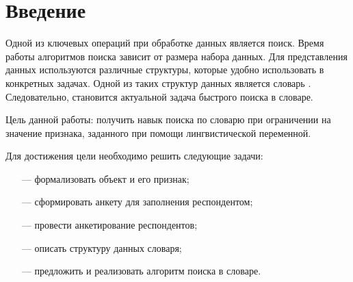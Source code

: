 \chapter*{Введение}

Одной из ключевых операций при обработке данных является поиск. Время работы алгоритмов поиска зависит от размера набора данных. Для представления данных используются различные структуры, которые удобно использовать в конкретных задачах. Одной из таких структур данных является словарь \cite{dict}. Следовательно, становится актуальной задача быстрого поиска в словаре.

Цель данной работы: получить навык поиска по словарю при ограничении на значение признака, заданного при помощи лингвистической переменной. 

Для достижения цели необходимо решить следующие задачи:
\begin{enumerate}
	\item[---] формализовать объект и его признак;
	\item[---] сформировать анкету для заполнения респондентом;
	\item[---] провести анкетирование респондентов;
	\item[---] описать структуру данных словаря;
	\item[---] предложить и реализовать алгоритм поиска в словаре.
\end{enumerate}

